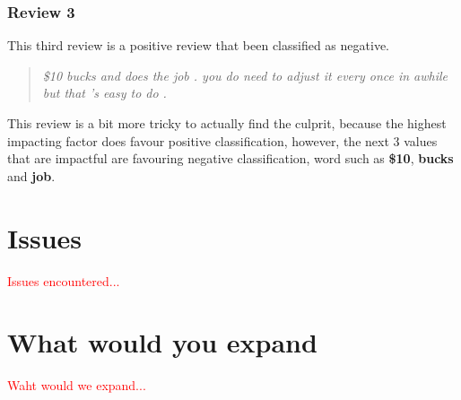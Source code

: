\documentclass[runningheads]{llncs}
\begin{document}
    \subsubsection{Review 3}
    This third review is a positive review that been classified as negative.
    \begin{quotation}
        \textit{\$10 bucks and does the job . you do need to adjust it every once in awhile but that 's easy to do .}
    \end{quotation}
    This review is a bit more tricky to actually find the culprit, because the highest impacting factor does favour positive classification, however, the next 3 values that are impactful are favouring negative classification, word such as \textbf{\$10}, \textbf{bucks} and \textbf{job}.
    \section{Issues}
    \textcolor{red}{Issues encountered...}
    \section{What would you expand}
    \textcolor{red}{Waht would we expand...}
    
    
    
\end{document}
